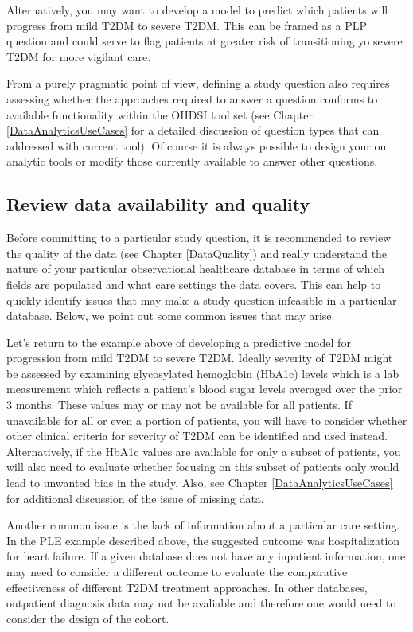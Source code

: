 \documentclass[11pt]{book}
\theoremstyle{definition}
\theoremstyle{definition}
\theoremstyle{definition}
\theoremstyle{remark}
\begin{document}
Alternatively, you may want to develop a model to predict which patients will progress from mild T2DM to severe T2DM. This can be framed as a PLP question and could serve to flag patients at greater risk of transitioning yo severe T2DM for more vigilant care.

From a purely pragmatic point of view, defining a study question also requires assessing whether the approaches required to answer a question conforms to available functionality within the OHDSI tool set (see Chapter \ref{DataAnalyticsUseCases} for a detailed discussion of question types that can addressed with current tool). Of course it is always possible to design your on analytic tools or modify those currently available to answer other questions.

\hypertarget{review-data-availability-and-quality}{%
\subsection{Review data availability and quality}\label{review-data-availability-and-quality}}

Before committing to a particular study question, it is recommended to review the quality of the data (see Chapter \ref{DataQuality}) and really understand the nature of your particular observational healthcare database in terms of which fields are populated and what care settings the data covers. This can help to quickly identify issues that may make a study question infeasible in a particular database. Below, we point out some common issues that may arise.

Let's return to the example above of developing a predictive model for progression from mild T2DM to severe T2DM. Ideally severity of T2DM might be assessed by examining glycosylated hemoglobin (HbA1c) levels which is a lab measurement which reflects a patient's blood sugar levels averaged over the prior 3 months. These values may or may not be available for all patients. If unavailable for all or even a portion of patients, you will have to consider whether other clinical criteria for severity of T2DM can be identified and used instead. Alternatively, if the HbA1c values are available for only a subset of patients, you will also need to evaluate whether focusing on this subset of patients only would lead to unwanted bias in the study. Also, see Chapter \ref{DataAnalyticsUseCases} for additional discussion of the issue of missing data.

Another common issue is the lack of information about a particular care setting. In the PLE example described above, the suggested outcome was hospitalization for heart failure. If a given database does not have any inpatient information, one may need to consider a different outcome to evaluate the comparative effectiveness of different T2DM treatment approaches. In other databases, outpatient diagnosis data may not be avaliable and therefore one would need to consider the design of the cohort.
\end{document}
